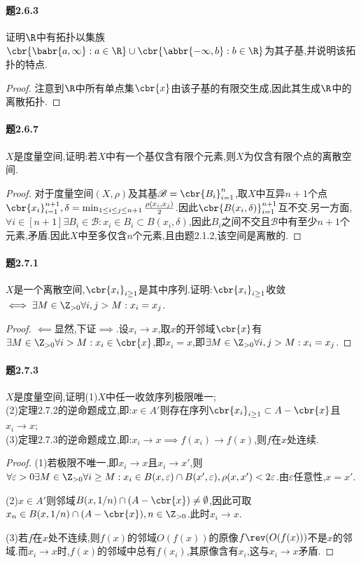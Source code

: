 \documentclass{article}
\begin{document}
\paragraph{题2.6.3}证明$\R$中有拓扑以集族$\cbr{\babr{a,\infty}:a\in\R}\cup\cbr{\abbr{-\infty,b}:b\in\R}$为其子基,并说明该拓扑的特点.
\begin{proof}
    注意到$\R$中所有单点集$\cbr{x}$由该子基的有限交生成,因此其生成$\R$中的离散拓扑.
\end{proof}

\paragraph{题2.6.7}$X$是度量空间,证明:若$X$中有一个基仅含有限个元素,则$X$为仅含有限个点的离散空间.
\begin{proof}
    对于度量空间$(X,\rho)$及其基$\mathscr{B}=\cbr{B_i}_{i=1}^n$,取$X$中互异$n+1$个点$\cbr{x_i}_{i=1}^{n+1},\delta=\min_{1\leq i\leq j\leq n+1}\frac{\rho(x_i,x_j)}{2}$.因此$\cbr{B(x_i,\delta)}_{i=1}^{n+1}$互不交.另一方面,$\forall i\in [n+1]\exists B_i\in \mathscr{B}: x_i\in B_i\subset B(x_i,\delta)$,因此$B_i$之间不交且$\mathscr{B}$中有至少$n+1$个元素,矛盾.因此$X$中至多仅含$n$个元素,且由题2.1.2,该空间是离散的.
\end{proof}

\paragraph{题2.7.1}$X$是一个离散空间,$\cbr{x_i}_{i\geq 1}$是其中序列.证明:$\cbr{x_i}_{i\geq 1}$收敛$\iff \exists M\in \Z_{>0}\forall i,j>M:x_i=x_j$.
\begin{proof}
    $\impliedby$显然,下证$\implies$.设$x_i\to x$,取$x$的开邻域$\cbr{x}$有$\exists M\in \Z_{>0}\forall i>M:x_i\in \cbr{x}$,即$x_i=x$,即$\exists M\in \Z_{>0}\forall i,j>M:x_i=x_j$.
\end{proof}

\paragraph{题2.7.3}$X$是度量空间,证明(1)$X$中任一收敛序列极限唯一;\\
(2)定理2.7.2的逆命题成立,即:$x\in A'$则存在序列$\cbr{x_i}_{i\geq 1}\subset A-\cbr{x}$且$x_i\to x$;\\
(3)定理2.7.3的逆命题成立,即:$x_i\to x\implies f(x_i)\to f(x)$,则$f$在$x$处连续.
\begin{proof}
    (1)若极限不唯一,即$x_i\to x$且$x_i\to x'$,则$\forall \varepsilon>0\exists M\in \Z_{>0}\forall i\geq M:x_i\in B(x,\varepsilon)\cap B(x',\varepsilon), \rho(x,x')<2\varepsilon$.由$\varepsilon$任意性,$x=x'$.

    (2)$x\in A'$则邻域$B(x,1/n)\cap (A-\cbr{x})\neq\emptyset$,因此可取$x_n\in B(x,1/n)\cap (A-\cbr{x}), n\in \Z_{>0}$.此时$x_i\to x$.

    (3)若$f$在$x$处不连续,则$f(x)$的邻域$O(f(x))$的原像$f\rev(O(f(x)))$不是$x$的邻域.而$x_i\to x$时,$f(x)$的邻域中总有$f(x_i)$,其原像含有$x_i$,这与$x_i\to x$矛盾.
\end{proof}
\end{document}
